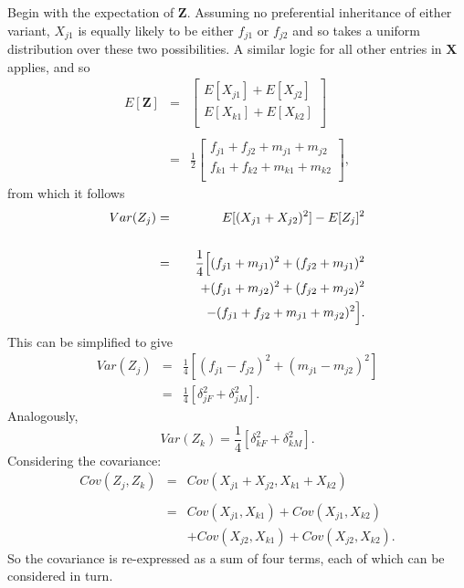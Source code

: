 \documentclass[sts]{imsart}
\newcommand{\ve}[1]{\mathbf{#1}}           %
\newcommand{\m}[1]{\mathbf{#1}}               %
\begin{document}
Begin with the expectation of $\ve{Z}$. Assuming no preferential inheritance of either variant, $X_{j1}$ is equally likely to be either $f_{j1}$ or $f_{j2}$ and so takes a uniform distribution over these two possibilities. A similar logic for all other entries in $\m{X}$ applies, and so
\begin{eqnarray}
    E[\ve{Z}] & = & {\begin{bmatrix}
        E[X_{j1}] + E[X_{j2}] \\
        E[X_{k1}] + E[X_{k2}] \\
      \end{bmatrix}} \nonumber\\
    & & \nonumber\\
    & = & {\frac{1}{2}\begin{bmatrix}
        f_{j1} + f_{j2} + m_{j1} + m_{j2} \\
        f_{k1} + f_{k2} + m_{k1} + m_{k2} \\
      \end{bmatrix}}, \nonumber
\end{eqnarray}
from which it follows
\begin{eqnarray}
    Var(Z_j) & = & E[(X_{j1} + X_{j2})^2] - E[Z_j]^2 \nonumber\\
    & & \nonumber\\ 
    & = & \frac{1}{4} \Big[ (f_{j1} + m_{j1})^2 + (f_{j2} + m_{j1})^2 \nonumber\\
    & & \hspace{0.5cm} + (f_{j1} + m_{j2})^2 + (f_{j2} + m_{j2})^2  \nonumber\\
    & & \hspace{0.5cm}  - (f_{j1} + f_{j2} + m_{j1} + m_{j2})^2 \Big]. \nonumber
\end{eqnarray}
This can be simplified to give
\begin{eqnarray} 
  Var(Z_j) & = & \frac{1}{4} \left [ (f_{j1} - f_{j2})^2 + (m_{j1} - m_{j2})^2 \right ] \nonumber \\
  & = & \frac{1}{4} \left [ \delta_{jF}^2 + \delta_{jM}^2 \right ]. \label{eq:z1var}
\end{eqnarray}
Analogously,
\begin{equation} \label{eq:z2var}
  Var(Z_k) = \frac{1}{4} \left [ \delta_{kF}^2 + \delta_{kM}^2 \right ].
\end{equation}
Considering the covariance:
\begin{eqnarray} 
    Cov(Z_j, Z_k) & = & Cov(X_{j1} + X_{j2}, X_{k1} + X_{k2}) \nonumber\\
    & & \nonumber \\
    & = & Cov(X_{j1}, X_{k1}) + Cov(X_{j1}, X_{k2}) \label{eq:covstep1} \\
    & &  + Cov(X_{j2}, X_{k1}) + Cov(X_{j2}, X_{k2}). \nonumber
\end{eqnarray}
So the covariance is re-expressed as a sum of four terms, each of which can be considered in turn.
\end{document}
